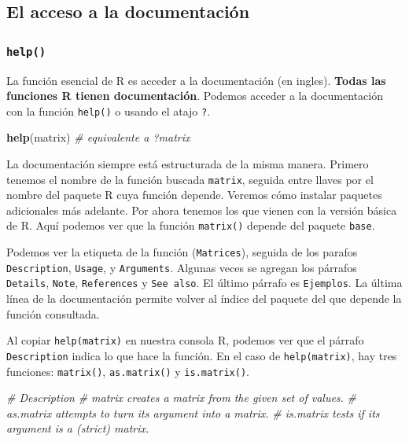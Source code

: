 \documentclass[
]{book}
\newenvironment{Shaded}{\begin{snugshade}}{\end{snugshade}}
\newcommand{\CommentTok}[1]{\textcolor[rgb]{0.56,0.35,0.01}{\textit{#1}}}
\newcommand{\KeywordTok}[1]{\textcolor[rgb]{0.13,0.29,0.53}{\textbf{#1}}}
\newcommand{\NormalTok}[1]{#1}
\begin{document}
\hypertarget{el-acceso-a-la-documentaciuxf3n}{%
\subsection{El acceso a la documentación}\label{el-acceso-a-la-documentaciuxf3n}}

\hypertarget{l015help}{%
\subsubsection{\texorpdfstring{\texttt{help()}}{help()}}\label{l015help}}

La función esencial de R es acceder a la documentación (en ingles). \textbf{Todas las funciones R tienen documentación}. Podemos acceder a la documentación con la función \texttt{help()} o usando el atajo \texttt{?}.

\begin{Shaded}
\begin{Highlighting}[]
\KeywordTok{help}\NormalTok{(matrix) }\CommentTok{# equivalente a ?matrix}
\end{Highlighting}
\end{Shaded}

La documentación siempre está estructurada de la misma manera. Primero tenemos el nombre de la función buscada \texttt{matrix}, seguida entre llaves por el nombre del paquete R cuya función depende. Veremos cómo instalar paquetes adicionales más adelante. Por ahora tenemos los que vienen con la versión básica de R. Aquí podemos ver que la función \texttt{matrix()} depende del paquete \texttt{base}.

Podemos ver la etiqueta de la función (\texttt{Matrices}), seguida de los parafos \texttt{Description}, \texttt{Usage}, y \texttt{Arguments}. Algunas veces se agregan los párrafos \texttt{Details}, \texttt{Note}, \texttt{References} y \texttt{See\ also}. El último párrafo es \texttt{Ejemplos}. La última línea de la documentación permite volver al índice del paquete del que depende la función consultada.

Al copiar \texttt{help(matrix)} en nuestra consola R, podemos ver que el párrafo \texttt{Description} indica lo que hace la función. En el caso de \texttt{help(matrix)}, hay tres funciones: \texttt{matrix()}, \texttt{as.matrix()} y \texttt{is.matrix()}.

\begin{Shaded}
\begin{Highlighting}[]
\CommentTok{# Description}
\CommentTok{# matrix creates a matrix from the given set of values.}
\CommentTok{# as.matrix attempts to turn its argument into a matrix.}
\CommentTok{# is.matrix tests if its argument is a (strict) matrix.}
\end{Highlighting}
\end{Shaded}
\end{document}
